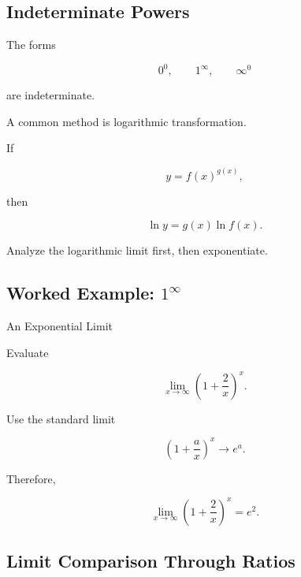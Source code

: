 \subsection{Indeterminate Powers}
\label{subsec:indeterminate-powers-reference}

The forms

\[
\boxed{
0^0,
\qquad
1^\infty,
\qquad
\infty^0
}
\]

are indeterminate.

A common method is logarithmic transformation.

If

\[
y=f(x)^{g(x)},
\]

then

\[
\boxed{
\ln y
=
g(x)\ln f(x).
}
\]

Analyze the logarithmic limit first, then exponentiate.

\subsection{Worked Example: \(1^\infty\)}
\label{subsec:worked-one-infinity}

\begin{workedexamplebox}{An Exponential Limit}

Evaluate

\[
\lim_{x\to\infty}
\left(
1+\frac{2}{x}
\right)^x.
\]

Use the standard limit

\[
\left(
1+\frac{a}{x}
\right)^x
\to
e^a.
\]

Therefore,

\begin{answerbox}
\[
\boxed{
\lim_{x\to\infty}
\left(
1+\frac{2}{x}
\right)^x
=
e^2.
}
\]
\end{answerbox}

\end{workedexamplebox}

\subsection{Limit Comparison Through Ratios}
\label{subsec:ratio-comparison-limits}

